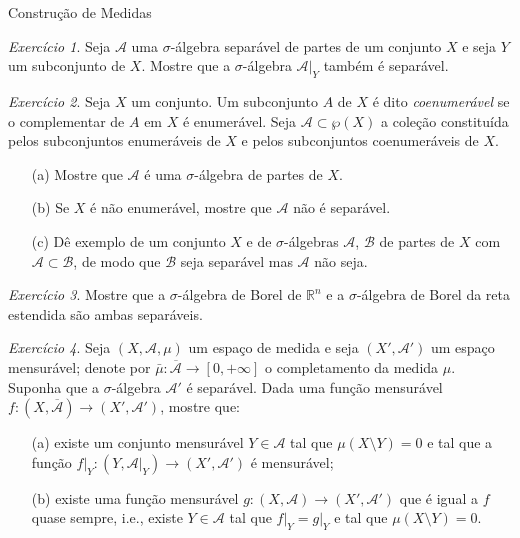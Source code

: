\documentclass[oneside,final,11pt]{amsbook}
\newcommand{\R}{\mathds R}
\theoremstyle{remark}\newtheorem{exercise}{Exercício}[chapter]
\theoremstyle{remark}\newtheorem{*exercise}[exercise]{\hbox to 0pt{\hskip 0pt minus 1fil*}Exercício}
\theoremstyle{definition}\newtheorem{exdefin}{Definição}[chapter]
\theoremstyle{plain}\newtheorem{teo}{Teorema}[section]
\theoremstyle{plain}\newtheorem{lem}[teo]{Lema}
\theoremstyle{plain}\newtheorem{prop}[teo]{Proposição}
\theoremstyle{plain}\newtheorem{cor}[teo]{Corolário}
\theoremstyle{definition}\newtheorem{defin}[teo]{Definição}
\theoremstyle{remark}\newtheorem{rem}[teo]{Observação}
\theoremstyle{definition}\newtheorem{notation}[teo]{Notação}
\theoremstyle{definition}\newtheorem{convention}[teo]{Convenção}
\theoremstyle{definition}\newtheorem{example}[teo]{Exemplo}
\numberwithin{section}{chapter}
\numberwithin{equation}{section}
\begin{document}
\begin{chapter}{Construção de Medidas}
\begin{exercise}
Seja $\mathcal A$ uma $\sigma$-álgebra separável de partes de um conjunto $X$
e seja $Y$ um subconjunto de $X$.
Mostre que a $\sigma$-álgebra $\mathcal A\vert_Y$ também é separável.
\end{exercise}

\begin{exercise}
Seja $X$ um conjunto. Um subconjunto $A$ de $X$ é dito {\em coenumerável\/}%
 se o complementar
de $A$ em $X$ é enumerável. Seja $\mathcal A\subset\wp(X)$ a coleção constituída pelos subconjuntos enumeráveis de $X$
e pelos subconjuntos coenumeráveis de $X$.
\begin{itemize}
\item[(a)] Mostre que $\mathcal A$ é uma $\sigma$-álgebra de partes de $X$.
\item[(b)] Se $X$ é não enumerável, mostre que $\mathcal A$ não é separável.
\item[(c)] Dê exemplo de um conjunto $X$ e de $\sigma$-álgebras $\mathcal A$, $\mathcal B$ de partes de $X$
com $\mathcal A\subset\mathcal B$, de modo que $\mathcal B$ seja separável mas $\mathcal A$ não seja.
\end{itemize}
\end{exercise}

\begin{exercise}\label{exe:Borelsepar}
Mostre que a $\sigma$-álgebra de Borel de $\R^n$ e a $\sigma$-álgebra de Borel
da reta estendida são ambas separáveis.
\end{exercise}

\begin{exercise}\label{exe:quaseigualmens}
Seja $(X,\mathcal A,\mu)$ um espaço de medida e seja $(X',\mathcal A')$ um espaço mensurável;
denote por $\bar\mu:\overline{\mathcal A}\to[0,+\infty]$ o completamento da medida $\mu$.
Suponha que a $\sigma$-álgebra $\mathcal A'$ é separável. Dada uma função
mensurável $f:(X,\overline{\mathcal A})\to(X',\mathcal A')$,
mostre que:
\begin{itemize}
\item[(a)] existe um conjunto mensurável $Y\in\mathcal A$ tal que $\mu(X\setminus Y)=0$ e tal que a função
$f\vert_Y:(Y,\mathcal A\vert_Y)\to(X',\mathcal A')$ é mensurável;
\item[(b)] existe uma função mensurável $g:(X,\mathcal A)\to(X',\mathcal A')$ que é igual
a $f$ quase sempre, i.e., existe $Y\in\mathcal A$ tal que $f\vert_Y=g\vert_Y$
e tal que $\mu(X\setminus Y)=0$.
\end{itemize}
\end{exercise}

\end{chapter}
\end{document}
